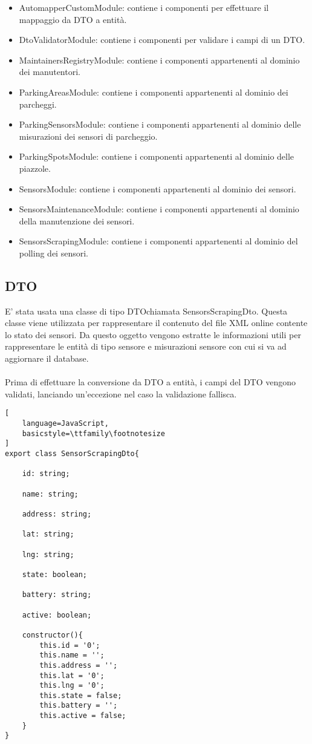 \begin{itemize}
    \item AutomapperCustomModule: contiene i componenti per effettuare il mappaggio da DTO a entità.
    \item DtoValidatorModule: contiene i componenti per validare i campi di un DTO.
    \item MaintainersRegistryModule: contiene i componenti appartenenti al dominio dei manutentori.
    \item ParkingAreasModule: contiene i componenti appartenenti al dominio dei parcheggi.
    \item ParkingSensorsModule: contiene i componenti appartenenti al dominio delle misurazioni dei sensori di parcheggio.
    \item ParkingSpotsModule: contiene i componenti appartenenti al dominio delle piazzole.
    \item SensorsModule: contiene i componenti appartenenti al dominio dei sensori.
    \item SensorsMaintenanceModule: contiene i componenti appartenenti al dominio della manutenzione dei sensori.
    \item SensorsScrapingModule: contiene i componenti appartenenti al dominio del polling dei sensori.
\end{itemize}

\subsection{DTO}
E' stata usata una classe di tipo \gls{DTO}\glsfirstoccur chiamata SensorsScrapingDto. Questa classe viene utilizzata per rappresentare
il contenuto del file \gls{XML} online contente lo stato dei sensori. Da questo oggetto vengono estratte le informazioni
utili per rappresentare le entità di tipo sensore e misurazioni sensore con cui si va ad aggiornare il database.
\\\\
Prima di effettuare la conversione da \gls{DTO} a entità, i campi del \gls{DTO} vengono validati, lanciando un'eccezione nel caso 
la validazione fallisca.
\\
\begin{lstlisting}[
    language=JavaScript,
    basicstyle=\ttfamily\footnotesize
]
export class SensorScrapingDto{
    
    id: string;

    name: string;

    address: string;

    lat: string;

    lng: string;

    state: boolean;

    battery: string;

    active: boolean;

    constructor(){
        this.id = '0';
        this.name = '';
        this.address = '';
        this.lat = '0';
        this.lng = '0';
        this.state = false;
        this.battery = '';
        this.active = false;
    }
}
\end{lstlisting}
